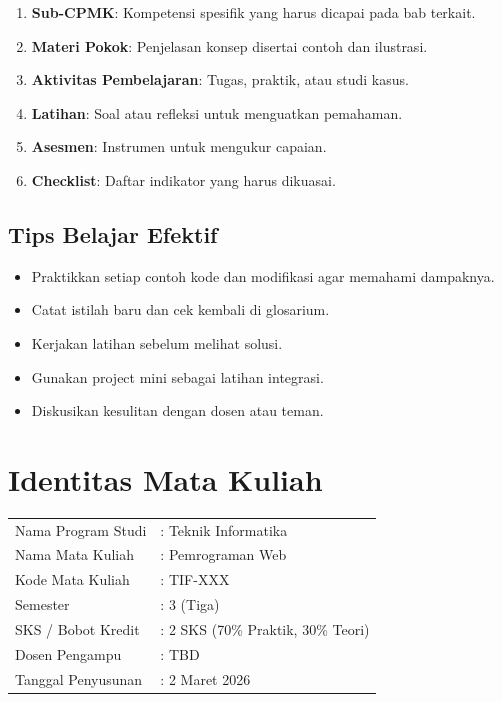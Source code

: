 \begin{enumerate}
  \item \textbf{Sub-CPMK}: Kompetensi spesifik yang harus dicapai pada bab terkait.
  \item \textbf{Materi Pokok}: Penjelasan konsep disertai contoh dan ilustrasi.
  \item \textbf{Aktivitas Pembelajaran}: Tugas, praktik, atau studi kasus.
  \item \textbf{Latihan}: Soal atau refleksi untuk menguatkan pemahaman.
  \item \textbf{Asesmen}: Instrumen untuk mengukur capaian.
  \item \textbf{Checklist}: Daftar indikator yang harus dikuasai.
\end{enumerate}

\section*{Tips Belajar Efektif}

\begin{itemize}
  \item Praktikkan setiap contoh kode dan modifikasi agar memahami dampaknya.
  \item Catat istilah baru dan cek kembali di glosarium.
  \item Kerjakan latihan sebelum melihat solusi.
  \item Gunakan project mini sebagai latihan integrasi.
  \item Diskusikan kesulitan dengan dosen atau teman.
\end{itemize}

\cleardoublepage

\chapter*{Identitas Mata Kuliah}

\begin{tabular}{ll}
  Nama Program Studi & : Teknik Informatika \\
  Nama Mata Kuliah & : Pemrograman Web \\
  Kode Mata Kuliah & : TIF-XXX \\
  Semester & : 3 (Tiga) \\
  SKS / Bobot Kredit & : 2 SKS (70\% Praktik, 30\% Teori) \\
  Dosen Pengampu & : TBD \\
  Tanggal Penyusunan & : 2 Maret 2026 \\
\end{tabular}

